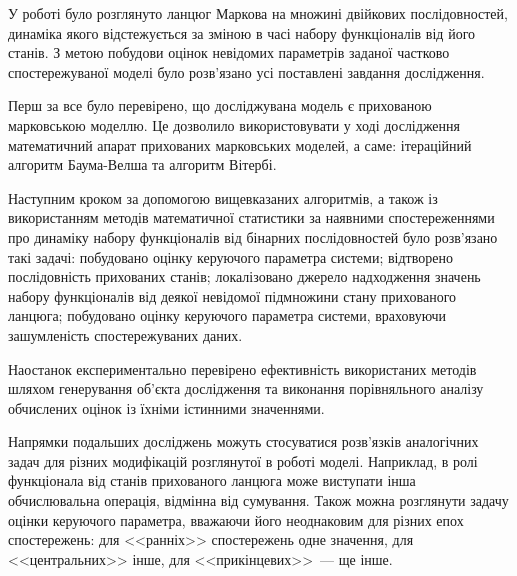 У роботі було розглянуто ланцюг Маркова на множині двійкових послідовностей, динаміка якого відстежується за зміною в часі набору функціоналів від його станів. З метою побудови оцінок невідомих параметрів заданої частково спостережуваної моделі було розв'язано усі поставлені завдання дослідження. 

Перш за все було перевірено, що досліджувана модель є прихованою марковською моделлю. Це дозволило використовувати у ході дослідження математичний апарат прихованих марковських моделей, а саме: ітераційний алгоритм Баума-Велша та алгоритм Вітербі. 

Наступним кроком за допомогою вищевказаних алгоритмів, а також із використанням методів математичної статистики за наявними спостереженнями про динаміку набору функціоналів від бінарних послідовностей було розв'язано такі задачі: побудовано оцінку керуючого параметра системи; відтворено послідовність прихованих станів; локалізовано джерело надходження значень набору функціоналів від деякої невідомої підмножини стану прихованого ланцюга; побудовано оцінку керуючого параметра системи, враховуючи зашумленість спостережуваних даних.

Наостанок експериментально перевірено ефективність використаних методів шляхом генерування об'єкта дослідження та виконання порівняльного аналізу обчислених оцінок із їхніми істинними значеннями.

Напрямки подальших досліджень можуть стосуватися розв'язків аналогічних задач для різних модифікацій розглянутої в роботі моделі. Наприклад, в ролі функціонала від станів прихованого ланцюга може виступати інша обчислювальна операція, відмінна від сумування. Також можна розглянути задачу оцінки керуючого параметра, вважаючи його неоднаковим для різних епох спостережень: для <<ранніх>> спостережень одне значення, для <<центральних>> інше, для <<прикінцевих>>~--- ще інше.